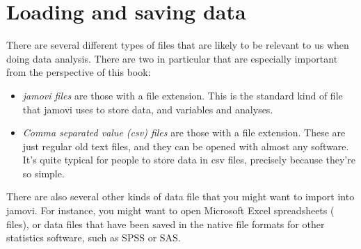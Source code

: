 \begin{comment}
\SUBSECTION{What other options are there?}

The advantage to the approach described in the previous section is that it solves a quite specific problem (but a commonly encountered one) with a minimum of fuss. The disadvantage is that the tools are quite limited in scope. They allow you to switch your data back and forth between two different formats that are very common in everyday data analysis. However, there a number of other tools that you can use if need be. Just within the core packages distributed with \R\ there is the \rtext{reshape()} function, as well as  the \rtext{stack()} and \rtext{unstack()} functions, all of which can be useful under certain circumstances. And there are of course thousands of packages on CRAN that you can use to help you with different tasks. One popular package for this purpose is the \rtext{reshape} package, written by Hadley Wickham \cite<see>[for details]{Wickham2007}. There are two key functions in this package, called \rtext{melt()} and \rtext{cast()} that are pretty useful for solving a lot of reshaping problems. In a future version of this book I intend to discuss \rtext{melt()} and \rtext{cast()} in a fair amount of detail.


\end{comment}



\section{Loading and saving data\label{sec:load}}


There are several different types of files that are likely to be relevant to us when doing data analysis. There are two in particular that are especially important from the perspective of this book:
\begin{itemize}
\item {\it jamovi files} are those with a  file extension. This is the standard kind of file that jamovi uses to store data, and variables and analyses. 
\item {\it Comma separated value (csv) files} are those with a  file extension. These are just regular old text files, and they can be opened with almost any software. It's quite typical for people to store data in csv files, precisely because they're so simple.
\end{itemize} 

There are also several other kinds of data file that you might want to import into jamovi. For instance, you might want to open Microsoft Excel spreadsheets ( files), or data files that have been saved in the native file formats for other statistics software, such as SPSS or SAS.  

